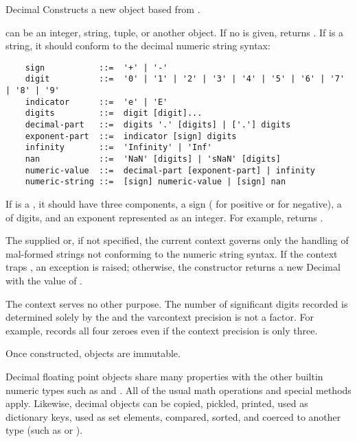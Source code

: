 \begin{classdesc}{Decimal}{}
  Constructs a new  object based from .

   can be an integer, string, tuple, or another 
  object. If no  is given, returns .  If
   is a string, it should conform to the decimal numeric string
  syntax:
    
  \begin{verbatim}
    sign           ::=  '+' | '-'
    digit          ::=  '0' | '1' | '2' | '3' | '4' | '5' | '6' | '7' | '8' | '9'
    indicator      ::=  'e' | 'E'
    digits         ::=  digit [digit]...
    decimal-part   ::=  digits '.' [digits] | ['.'] digits
    exponent-part  ::=  indicator [sign] digits
    infinity       ::=  'Infinity' | 'Inf'
    nan            ::=  'NaN' [digits] | 'sNaN' [digits]
    numeric-value  ::=  decimal-part [exponent-part] | infinity
    numeric-string ::=  [sign] numeric-value | [sign] nan  
  \end{verbatim}

  If  is a , it should have three components,
  a sign ( for positive or  for negative),
  a  of digits, and an exponent represented as an integer.
  For example,  returns
  .

  The supplied  or, if not specified, the current context
  governs only the handling of mal-formed strings not conforming to the
  numeric string syntax.  If the context traps ,
  an exception is raised; otherwise, the constructor returns a new Decimal
  with the value of .

  The context serves no other purpose.  The number of significant digits
  recorded is determined solely by the  and the var{context}
  precision is not a factor.  For example,  records
  all four zeroes even if the context precision is only three.

  Once constructed,  objects are immutable.
\end{classdesc}

Decimal floating point objects share many properties with the other builtin
numeric types such as  and .  All of the usual
math operations and special methods apply.  Likewise, decimal objects can
be copied, pickled, printed, used as dictionary keys, used as set elements,
compared, sorted, and coerced to another type (such as 
or ).

